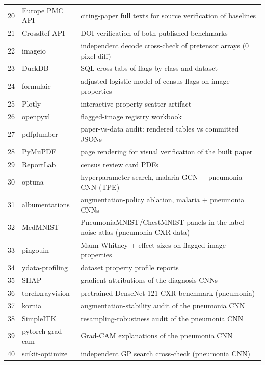 \begin{longtable}{r p{4.6cm} p{8.2cm}}
20 & Europe PMC API & citing-paper full texts for source verification of baselines \\
21 & CrossRef API & DOI verification of both published benchmarks \\
22 & imageio & independent decode cross-check of pretensor arrays (0 pixel diff) \\
23 & DuckDB & SQL cross-tabs of flags by class and dataset \\
24 & formulaic & adjusted logistic model of census flags on image properties \\
25 & Plotly & interactive property-scatter artifact \\
26 & openpyxl & flagged-image registry workbook \\
27 & pdfplumber & paper-vs-data audit: rendered tables vs committed JSONs \\
28 & PyMuPDF & page rendering for visual verification of the built paper \\
29 & ReportLab & census review card PDFs \\
30 & optuna & hyperparameter search, malaria GCN + pneumonia CNN (TPE) \\
31 & albumentations & augmentation-policy ablation, malaria + pneumonia CNNs \\
32 & MedMNIST & PneumoniaMNIST/ChestMNIST panels in the label-noise atlas (pneumonia CXR data) \\
33 & pingouin & Mann-Whitney + effect sizes on flagged-image properties \\
34 & ydata-profiling & dataset property profile reports \\
35 & SHAP & gradient attributions of the diagnosis CNNs \\
36 & torchxrayvision & pretrained DenseNet-121 CXR benchmark (pneumonia) \\
37 & kornia & augmentation-stability audit of the pneumonia CNN \\
38 & SimpleITK & resampling-robustness audit of the pneumonia CNN \\
39 & pytorch-grad-cam & Grad-CAM explanations of the pneumonia CNN \\
40 & scikit-optimize & independent GP search cross-check (pneumonia CNN) \\
\hline
\end{longtable}

